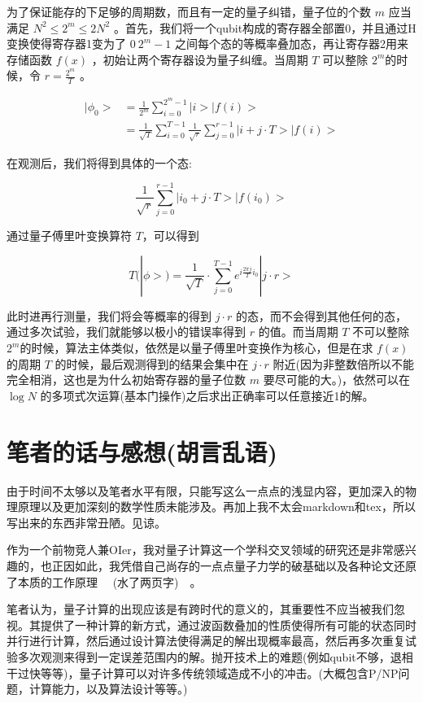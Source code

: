 \documentclass[fontset=windows]{article}
\begin{document}
为了保证能存的下足够的周期数，而且有一定的量子纠错，量子位的个数 $m$ 应当满足 $N^2 \le 2^m \le 2N^2$ 。首先，我们将一个qubit构成的寄存器全部置0，并且通过H变换使得寄存器1变为了 $0 ~ 2^m-1$ 之间每个态的等概率叠加态，再让寄存器2用来存储函数 $f(x)$ ，初始让两个寄存器设为量子纠缠。当周期 $T$ 可以整除 $2^m$的时候，令 $r = \frac{2^m}{T} $ 。

$$
\begin{aligned}
|\phi_0> &= \frac1{2^m} \sum_{i=0}^{2^m-1}{|i>|f(i)> } \\
&= \frac1{\sqrt T} \sum_{i=0}^{T-1}{{\frac{1}{\sqrt{r}}} \sum_{j=0}^{r-1}|i+j\cdot T>|f(i)> }
\end{aligned}
$$

在观测后，我们将得到具体的一个态:

$$
\frac{1}{\sqrt{r}} \sum_{j=0}^{r-1}|i_0+j\cdot T>|f(i_0)> 
$$

通过量子傅里叶变换算符 $T$，可以得到 

$$
T(|\phi>) = \frac{1}{\sqrt{T}} \cdot \sum_{j = 0}^{T - 1} e^{i \frac{2\pi j}{T}i_0} |j\cdot r>
$$

此时进再行测量，我们将会等概率的得到 $j\cdot r$ 的态，而不会得到其他任何的态，通过多次试验，我们就能够以极小的错误率得到 $r$ 的值。而当周期 $T$ 不可以整除 $2^m$的时候，算法主体类似，依然是以量子傅里叶变换作为核心，但是在求 $f(x)$的周期 $T$ 的时候，最后观测得到的结果会集中在 $j\cdot r$ 附近(因为非整数倍所以不能完全相消，这也是为什么初始寄存器的量子位数 $m$ 要尽可能的大。)，依然可以在 $\log{N}$ 的多项式次运算(基本门操作)之后求出正确率可以任意接近1的解。

\section{笔者的话与感想(胡言乱语)}
由于时间不太够以及笔者水平有限，只能写这么一点点的浅显内容，更加深入的物理原理以及更加深刻的数学性质未能涉及。再加上我不太会markdown和tex，所以写出来的东西非常丑陋。见谅。

作为一个前物竞人兼OIer，我对量子计算这一个学科交叉领域的研究还是非常感兴趣的，也正因如此，我凭借自己尚存的一点点量子力学的破基础以及各种论文还原了本质的工作原理 ~~(水了两页字)~~。

笔者认为，量子计算的出现应该是有跨时代的意义的，其重要性不应当被我们忽视。其提供了一种计算的新方式，通过波函数叠加的性质使得所有可能的状态同时并行进行计算，然后通过设计算法使得满足的解出现概率最高，然后再多次重复试验多次观测来得到一定误差范围内的解。抛开技术上的难题(例如qubit不够，退相干过快等等)，量子计算可以对许多传统领域造成不小的冲击。(大概包含P/NP问题，计算能力，以及算法设计等等。)
\end{document}
